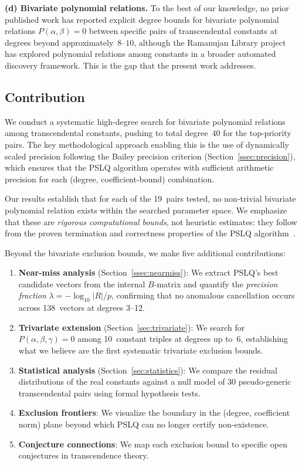 \documentclass[11pt]{amsart}
\theoremstyle{remark}
\begin{document}
\medskip\noindent\textbf{(d) Bivariate polynomial relations.}
To the best of our knowledge, no prior published work has reported explicit degree
bounds for bivariate polynomial relations $P(\alpha,\beta)=0$ between specific pairs
of transcendental constants at degrees beyond approximately~$8$--$10$, although the
Ramanujan Library project~\cite{Elimelech2024} has explored polynomial relations
among constants in a broader automated discovery framework. This is the gap that the
present work addresses.

\subsection{Contribution}\label{ssec:contribution}

We conduct a systematic high-degree search for bivariate polynomial relations among
transcendental constants, pushing to total degree~40 for the top-priority pairs. The
key methodological approach enabling this is the use of dynamically scaled precision
following the Bailey precision criterion (Section~\ref{ssec:precision}), which
ensures that the PSLQ algorithm operates with sufficient arithmetic precision for
each (degree, coefficient-bound) combination.

Our results establish that for each of the 19~pairs tested, no non-trivial bivariate
polynomial relation exists within the searched parameter space. We emphasize that
these are \emph{rigorous computational bounds}, not heuristic estimates: they follow
from the proven termination and correctness properties of the PSLQ
algorithm~\cite{FergusonBaileyArno1999}.

Beyond the bivariate exclusion bounds, we make five additional contributions:
\begin{enumerate}
\item \textbf{Near-miss analysis} (Section~\ref{ssec:nearmiss}): We extract
  PSLQ's best candidate vectors from the internal $B$-matrix and quantify the
  \emph{precision fraction} $\lambda = -\log_{10}|R|/p$, confirming that no
  anomalous cancellation occurs across 138~vectors at degrees 3--12.
\item \textbf{Trivariate extension} (Section~\ref{sec:trivariate}): We search
  for $P(\alpha,\beta,\gamma)=0$ among 10~constant triples at degrees up to~6,
  establishing what we believe are the first systematic trivariate exclusion bounds.
\item \textbf{Statistical analysis} (Section~\ref{sec:statistics}): We compare
  the residual distributions of the real constants against a null model of 30
  pseudo-generic transcendental pairs using formal hypothesis tests.
\item \textbf{Exclusion frontiers}: We visualize the boundary in the (degree,
  coefficient norm) plane beyond which PSLQ can no longer certify non-existence.
\item \textbf{Conjecture connections}: We map each exclusion bound to specific
  open conjectures in transcendence theory.
\end{enumerate}
\end{document}
